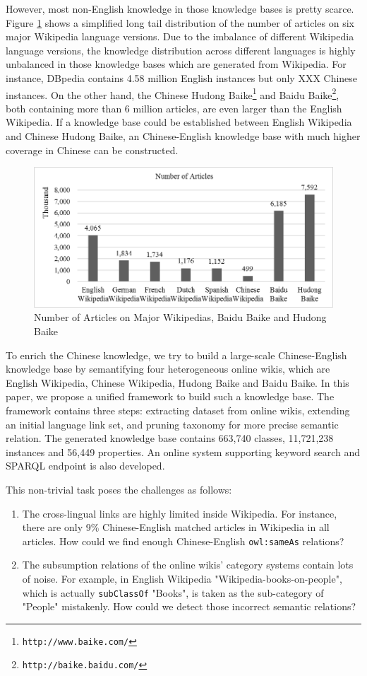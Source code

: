 \documentclass[runningheads,a4paper]{llncs}
\begin{document}
\begin{CJK*}{UTF8}{song}
However, most non-English knowledge in those knowledge bases is pretty scarce. Figure \ref{fig_stat} shows a simplified long tail distribution of the number of articles on six major Wikipedia language versions. Due to the imbalance of different Wikipedia language versions, the knowledge distribution across different languages is highly unbalanced in those knowledge bases which are generated from Wikipedia. For instance, DBpedia contains 4.58 million English instances but only XXX Chinese instances. On the other hand, the Chinese Hudong Baike\footnote{{\tt http://www.baike.com/}} and Baidu Baike\footnote{{\tt http://baike.baidu.com/}}, both containing more than 6 million articles, are even larger than the English Wikipedia. If a knowledge base could be established between English Wikipedia and Chinese Hudong Baike, an Chinese-English knowledge base with much higher coverage in Chinese can be constructed.

\begin{figure}[ht]
\centering
\includegraphics[width=0.75 \columnwidth]{fig/fig_stat.png}
\caption{Number of Articles on Major Wikipedias, Baidu Baike and Hudong Baike}
\label{fig_stat}
\end{figure}

To enrich the Chinese knowledge, we try to build a large-scale Chinese-English knowledge base by semantifying four heterogeneous online wikis, which are English Wikipedia, Chinese Wikipedia, Hudong Baike and Baidu Baike. In this paper, we propose a unified framework to build such a knowledge base. The framework contains three steps: extracting dataset from online wikis, extending an initial language link set, and pruning taxonomy for more precise semantic relation. The generated knowledge base contains 663,740 classes, 11,721,238 instances and 56,449 properties. An online system supporting keyword search and SPARQL endpoint is also developed.

This non-trivial task poses the challenges as follows:
\begin{enumerate}
  \item The cross-lingual links are highly limited inside Wikipedia. For instance, there are only 9\% Chinese-English matched articles in Wikipedia in all articles. How could we find enough Chinese-English \verb"owl:sameAs" relations?
  \item The subsumption relations of the online wikis' category systems contain lots of noise. For example, in English Wikipedia "Wikipedia-books-on-people", which is actually \verb"subClassOf" "Books", is taken as the sub-category of "People" mistakenly. How could we detect those incorrect semantic relations?
\end{enumerate}


\end{CJK*}
\end{document}
